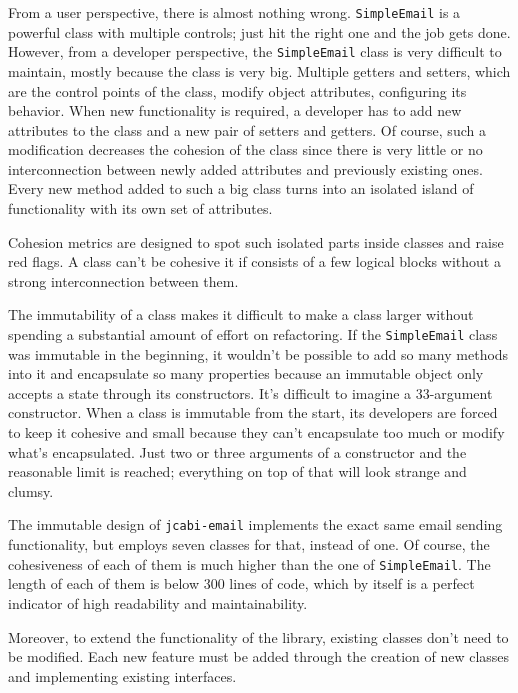 \documentclass[sigconf,10pt,nonacm=true]{acmart}
\newcommand{\code}[1]{\texttt{#1}}
\begin{document}
From a user perspective, there is almost nothing wrong. \code{SimpleEmail} is a powerful
class with multiple controls; just hit the right one and the job
gets done. However, from a developer perspective, the \code{SimpleEmail} class is
very difficult to maintain, mostly because the class is very big.
Multiple getters and setters, which are the control points of the class, modify
object attributes, configuring its behavior. When new functionality is
required, a developer has to add new attributes to the class and a new
pair of setters and getters. Of course, such a modification decreases the
cohesion of the class since there is very little or no interconnection
between newly added attributes and previously existing ones. Every new method
added to such a big class turns into an isolated island of functionality
with its own set of attributes.

Cohesion metrics are designed to spot such isolated parts inside classes and
raise red flags. A class can't be cohesive it if consists of a few logical
blocks without a strong interconnection between them.

The immutability of a class makes it difficult to make a class larger
without spending a substantial amount of effort on refactoring.
If the \code{SimpleEmail} class was immutable
in the beginning, it wouldn't be possible to add so many methods into it
and encapsulate so many properties because an immutable object only accepts a state
through its constructors. It's difficult to imagine a 33-argument constructor.
When a class is immutable from the start, its developers are forced
to keep it cohesive and small because they can't encapsulate
too much or modify what's encapsulated. Just two or three
arguments of a constructor and the reasonable limit is reached; everything
on top of that will look strange and clumsy.

The immutable design of \code{jcabi-email} implements the exact same
email sending functionality, but employs seven classes for that, instead
of one. Of course, the cohesiveness of each of them is much higher than
the one of \code{SimpleEmail}. The length of each of them is below 300
lines of code, which by itself is a perfect indicator of high readability
and maintainability.

Moreover, to extend the functionality of the library, existing classes
don't need to be modified. Each new feature must be added through
the creation of new classes and implementing existing interfaces.


\end{document}
